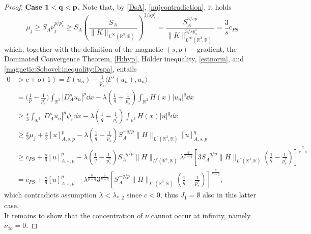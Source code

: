 \documentclass[leqno,11pt]{amsart}
\newcommand{\R}{\mathbb R}
\newcommand{\cE}{{\mathcal E}}
\newcommand{\eps}{\varepsilon}
\numberwithin{equation}{section}
\begin{document}
\begin{proof}
{\bf Case ${\bf 1<q<p}$.}
Note that, by \eqref{DsA}, \eqref{nujcontradiction}, it holds
$$
    \mu_j
    \ge 
    S_A\nu_j^{p/p^*_s}
    \ge 
    S_A\left( \frac{S_A}{\|K\|_{L^\infty(\R^3,\R)}}\right)^{3/sp^*_s}
    =
    \frac{S_A^{3/sp}}{\|K\|_{L^\infty(\R^3,\R)}^{3/sp^*_s}}=\frac{3}{s}c_{PS}
$$
which, together with the definition of the magnetic $(s,p)-$gradient, the Dominated Convergence Theorem, \eqref{H:hyp}, H\"older inequality, \eqref{estnorm}, and \eqref{magnetic:Sobovel:inequality:Dspa}, entails
\begin{equation}\label{epn:q=p}
\begin{aligned}
    0&>c+o(1)= \cE(u_n)-\frac{1}{p^*_s}\langle \cE'(u_n),u_n\rangle\\&=\biggl(\frac1{p}-\frac 1{p^*_s}  \biggr)\int_{\R^3}|D^s_A u_n|^p \dd x-\lambda\left(\frac{1}{q}-\frac{1}{p^*_s}\right)\int_{\R^3}H(x)|u_n|^{q}\dd x\\
    &\ge\frac s3  \int_{\R^3}|D^s_A u_n|^p\psi_\eps \dd x-\lambda\left(\frac1q-\frac{1}{p^*_s}\right)\int_{\R^3}H(x)|u|^{q}\dd x\\
    &\ge\frac s3 \mu_j+ \frac s3[u]_{A,s,p}^p-\lambda\left(\frac{1}{q}-\frac{1}{p^*_s}\right)S_A^{-q/p}\|H\|_{L^r(\R^3,\R)}[u]_{A,s,p}^{q}\\
    &\ge c_{PS}+ \frac s6[u]_{A,s,p}^p-\lambda\left(\frac{1}{q}-\frac{1}{p^*_s}\right)S_A^{-q/p}\|H\|_{L^r(\R^3,\R)}\lambda^{\frac{q}{p-q}}\left[3 S_A^{-q/p}\|H\|_{L^r(\R^3,\R)}\left(\frac{1}{q}-\frac{1}{p^*_s}\right)\right]^{\frac{q}{p-q}}\\
    &=c_{PS}+ \frac s6[u]_{A,s,p}^p-\lambda^{\frac{p}{p-q}}3^{\frac{q}{p-q}}\left[ S_A^{-q/p}\|H\|_{L^r(\R^3,\R)}\left(\frac{1}{q}-\frac{1}{p^*_s}\right)\right]^{\frac{p}{p-q}},
\end{aligned}
\end{equation}
which contradicts assumption $\lambda<\lambda_{*,2}$ since $c<0$, thus $J_1 = \emptyset$ also in this latter case. \\




It remains to show that the concentration
of $\nu$ cannot occur at infinity, namely $\nu_\infty=0$. 


\end{proof}
\end{document}
